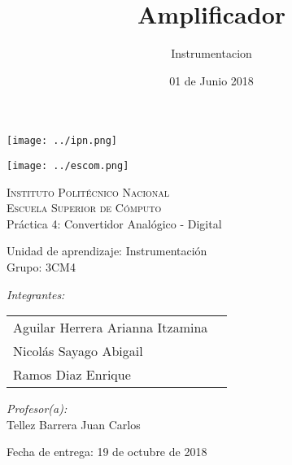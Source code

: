 \documentclass[12pt]{article}
\date{ 01 de Junio 2018}
\title{Amplificador}
\author{Instrumentacion}
\begin{document}
		\begin{titlepage}
			\begin{center}
				
				
				\noindent
				\begin{minipage}{0.5\textwidth}
					\begin{flushleft} \large
						\texttt{[image: ../ipn.png]}
					\end{flushleft}
				\end{minipage}%
				\begin{minipage}{0.55\textwidth}
					\begin{flushright} \large
						\texttt{[image: ../escom.png]}
					\end{flushright}
				\end{minipage}
				
				\textsc{\LARGE Instituto Politécnico Nacional}\\[0.5cm]
				
				\textsc{\Large Escuela Superior de Cómputo}\\[1cm]
				
				
				{ \huge Práctica 4: Convertidor Analógico - Digital \\[1cm] }
				
				{ \Large Unidad de aprendizaje: Instrumentación} \\[1cm]
				
				{ \Large Grupo: 3CM4 } \\[1cm]
				
				\noindent
				\begin{minipage}{0.5\textwidth}
					\begin{flushleft} \large
						\emph{Integrantes:}\\
						
						\begin{tabular}{ll}
						Aguilar Herrera Arianna Itzamina \\
					    Nicolás Sayago Abigail\\
					    Ramos Diaz Enrique \\
					\end{tabular}
					\end{flushleft}
				\end{minipage}%
				\begin{minipage}{0.5\textwidth}
					\begin{flushright} \large
						\emph{Profesor(a):} \\
						Tellez Barrera Juan Carlos  \\
					\end{flushright}
				\end{minipage}
				
				\vfill
				
				{\large Fecha de entrega: 19 de octubre de 2018}
			\end{center}
		\end{titlepage}
	
\end{document}
